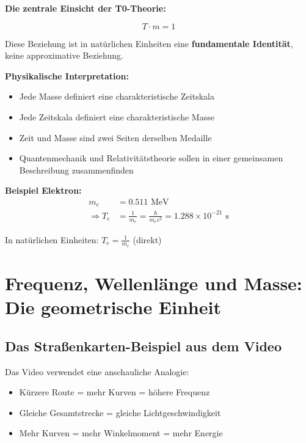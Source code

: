 	\begin{vorteil}
		\textbf{Die zentrale Einsicht der T0-Theorie:}
		
		\begin{equation}
			\boxed{T \cdot m = 1}
		\end{equation}
		
		Diese Beziehung ist in natürlichen Einheiten eine \textbf{fundamentale Identität}, keine approximative Beziehung.
		
		\textbf{Physikalische Interpretation:}
		\begin{itemize}
			\item Jede Masse definiert eine charakteristische Zeitskala
			\item Jede Zeitskala definiert eine charakteristische Masse
			\item Zeit und Masse sind zwei Seiten derselben Medaille
			\item Quantenmechanik und Relativitätstheorie sollen in einer gemeinsamen Beschreibung zusammenfinden
		\end{itemize}
		
		\textbf{Beispiel Elektron:}
		\begin{align}
			m_e &= 0.511 \text{ MeV} \\
			\Rightarrow T_e &= \frac{1}{m_e} = \frac{\hbar}{m_e c^2} = 1.288 \times 10^{-21} \text{ s}
		\end{align}
		
		In natürlichen Einheiten: $T_e = \frac{1}{m_e}$ (direkt)
	\end{vorteil}
	
	\section{Frequenz, Wellenlänge und Masse: Die geometrische Einheit}
	
	\subsection{Das Straßenkarten-Beispiel aus dem Video}
	
	Das Video verwendet eine anschauliche Analogie:
	\begin{itemize}
		\item Kürzere Route = mehr Kurven = höhere Frequenz
		\item Gleiche Gesamtstrecke = gleiche Lichtgeschwindigkeit
		\item Mehr Kurven = mehr Winkelmoment = mehr Energie
	\end{itemize}
	
